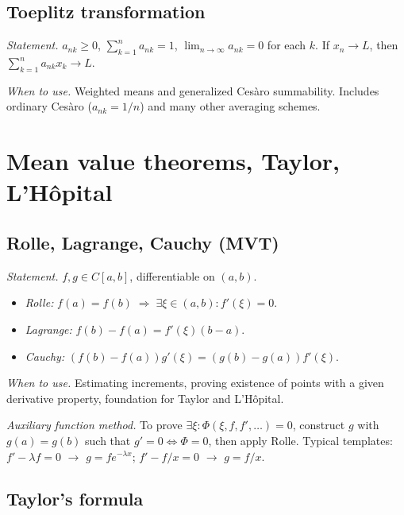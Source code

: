 \medskip

\subsection{Toeplitz transformation}
\label{subsec:toeplitz}

\textit{Statement.} $a_{nk}\ge0$, $\sum_{k=1}^n a_{nk}=1$, $\lim_{n\to\infty}a_{nk}=0$ for each $k$. If $x_n\to L$, then $\sum_{k=1}^n a_{nk}x_k\to L$.

\textit{When to use.} Weighted means and generalized Ces\`aro summability. Includes ordinary Ces\`aro ($a_{nk}=1/n$) and many other averaging schemes.

\medskip

\section{Mean value theorems, Taylor, L'H\^opital}
\label{sec:mvt-taylor}

\subsection{Rolle, Lagrange, Cauchy (MVT)}
\label{subsec:mvt}

\textit{Statement.} $f,g\in C[a,b]$, differentiable on $(a,b)$.
\begin{itemize}
  \item \textit{Rolle:} $f(a)=f(b)\;\Rightarrow\;\exists\xi\in(a,b): f'(\xi)=0$.
  \item \textit{Lagrange:} $f(b)-f(a)=f'(\xi)(b-a)$.
  \item \textit{Cauchy:} $(f(b)-f(a))g'(\xi)=(g(b)-g(a))f'(\xi)$.
\end{itemize}

\textit{When to use.} Estimating increments, proving existence of points with a given derivative property, foundation for Taylor and L'H\^opital.

\textit{Auxiliary function method.} To prove $\exists\xi:\Phi(\xi,f,f',\ldots)=0$, construct $g$ with $g(a)=g(b)$ such that $g'=0\Leftrightarrow\Phi=0$, then apply Rolle. Typical templates: $f'-\lambda f=0$ $\to$ $g=f e^{-\lambda x}$; $f'-f/x=0$ $\to$ $g=f/x$.

\medskip

\subsection{Taylor's formula}
\label{subsec:taylor}

